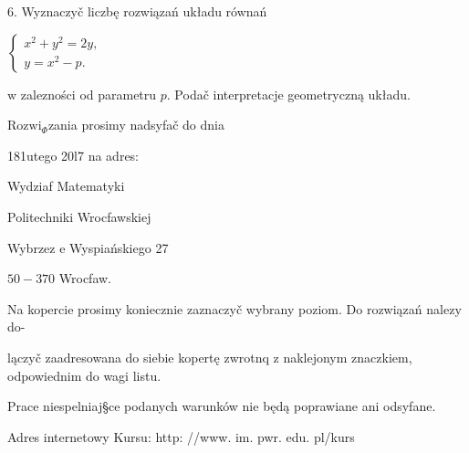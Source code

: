 \documentclass[a4paper,12pt]{article}
\begin{document}
6. Wyznaczyč liczbę rozwiązań układu równań

$\left\{\begin{array}{l}
x^{2}+y^{2}=2y,\\
y=x^{2}-p.
\end{array}\right.$

$\mathrm{w}$ zalezności od parametru $p$. Podač interpretacje geometryczną układu.

$\mathrm{R}\mathrm{o}\mathrm{z}\mathrm{w}\mathrm{i}_{\Phi}$zania prosimy nadsyfač do dnia

181utego 20l7 na adres:

Wydziaf Matematyki

Politechniki Wrocfawskiej

Wybrzez $\mathrm{e}$ Wyspiańskiego 27

$50-370$ Wrocfaw.

Na kopercie prosimy koniecznie zaznaczyč wybrany poziom. Do rozwiązań nalez$\mathrm{y}$ do-

lączyč zaadresowana do siebie kopertę zwrotnq $\mathrm{z}$ naklejonym znaczkiem, odpowiednim do wagi listu.

Prace niespelniaj\S ce podanych warunków nie będą poprawiane ani odsyfane.

Adres internetowy Kursu: http: //www. im. pwr. edu. pl/kurs
\end{document}
